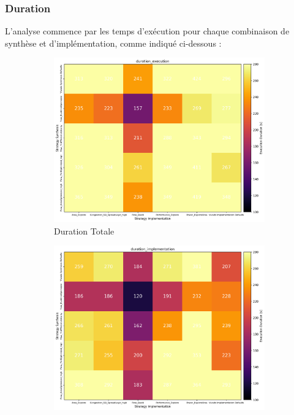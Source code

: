 \documentclass[../CSC_5RO07_TA.tex]{subfiles}
\begin{document}
\subsubsection{Duration}
\noindent L'analyse commence par les temps d'exécution pour chaque combinaison de synthèse et d'implémentation, comme indiqué ci-dessous :
\begin{figure}[h]
    \centering
    \begin{subfigure}[b]{0.30\textwidth}
        \centering
        \includegraphics[width=\linewidth]{images/3_duration_execution.png}
        \caption{Duration Totale}
        \label{fig:duration_total_3}
    \end{subfigure}\hfill
	\begin{subfigure}[b]{0.30\textwidth}
        \centering
        \includegraphics[width=\linewidth]{images/3_duration_implementation.png}

\end{subfigure}
\end{figure}
\end{document}
